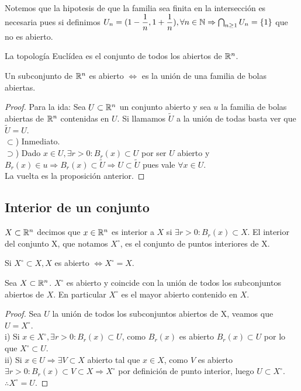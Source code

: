 Notemos que la hipotesis de que la familia sea finita en la intersección es necesaria pues si definimos $U_n = (1 - \dfrac{1}{n}, 1 + \dfrac{1}{n}), \forall n \in \mathbb{N} \Rightarrow \bigcap_{n \geq 1} U_n = \{1\}$ que no es abierto.

\begin{definition}
  La topología Euclídea es el conjunto de todos los abiertos de $\mathbb{R}^n$.
\end{definition}

\begin{corollary}
  Un subconjunto de $\mathbb{R}^n$ es abierto $\iff$ es la unión de una familia de bolas abiertas.
  \begin{proof}
    Para la ida: Sea $U \subset \mathbb{R}^n$ un conjunto abierto y sea $u$ la familia de bolas abiertas de $\mathbb{R}^n$ contenidas en $U$. Si llamamos $\tilde{U}$ a la unión de todas basta ver que $\tilde{U} = U$. \\
    $\subset$) Inmediato. \\
    $\supset$) Dado $x \in U, \exists r > 0 : B_r(x) \subset U$ por ser $U$ abierto y $B_r(x) \in u \Rightarrow B_r(x) \subset \tilde{U} \Rightarrow U \subset \tilde{U}$ pues vale $\forall x \in U$. \\
    La vuelta es la proposición anterior.
  \end{proof}
\end{corollary}

\subsection{Interior de un conjunto}

\begin{definition}[Interior]
  $X \subset \mathbb{R}^n$ decimos que $x \in \mathbb{R}^n$ es interior a $X$ si $\exists r > 0 : B_r(x) \subset X$. El interior del conjunto X, que notamos $X^{\circ}$, es el conjunto de puntos interiores de X.
\end{definition}

\begin{note}
  Si $X^{\circ} \subset X, X$ es abierto $\iff X^{\circ} = X$.
\end{note}

\begin{prop}
  Sea $X \subset \mathbb{R}^n$. $X^{\circ}$ es abierto y coincide con la unión de todos los subconjuntos abiertos de $X$. En particular $X^{\circ}$ es el mayor abierto contenido en $X$.
  \begin{proof}
    Sea $U$ la unión de todos los subconjuntos abiertos de X, veamos que $U = X^{\circ}$. \\
    i) Si $x \in X^{\circ}, \exists r > 0 : B_r(x) \subset U$, como $B_r(x)$ es abierto $B_r(x) \subset U$ por lo que $X^{\circ} \subset U$. \\
    ii) Si $x \in U \Rightarrow \exists V \subset X$ abierto tal que $x \in X$, como $V$ es abierto $\exists r > 0 : B_r(x) \subset V \subset X \Rightarrow X^{\circ}$ por definición de punto interior, luego $U \subset X^{\circ}$. \\
    $\therefore X^{\circ} = U$.
  \end{proof}
\end{prop}


